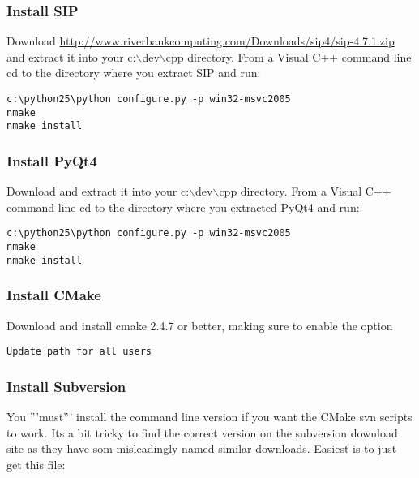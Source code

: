 \hypertarget{toc102}{}
\subsubsection{Install SIP}
Download \url{http://www.riverbankcomputing.com/Downloads/sip4/sip-4.7.1.zip} and extract it 
into your c:$\backslash$dev$\backslash$cpp directory.
From a Visual C++ command line cd to the directory where you extract SIP and run:

\begin{verbatim}
c:\python25\python configure.py -p win32-msvc2005
nmake
nmake install
\end{verbatim}

\hypertarget{toc103}{}
\subsubsection{Install PyQt4}
Download  and extract it 
into your c:$\backslash$dev$\backslash$cpp directory.
From a Visual C++ command line cd to the directory where you extracted PyQt4 and run:

\begin{verbatim}
c:\python25\python configure.py -p win32-msvc2005
nmake
nmake install
\end{verbatim}

\hypertarget{toc104}{}
\subsubsection{Install CMake}
Download and install cmake 2.4.7 or better, making sure to enable the 
option

\begin{verbatim}
Update path for all users
\end{verbatim}

\hypertarget{toc105}{}
\subsubsection{Install Subversion}
You '''must''' install the command line version if you want the CMake svn scripts to work.
Its a bit tricky to find the correct version on the subversion download site as they have 
som misleadingly named similar downloads. Easiest is to just get this file:


